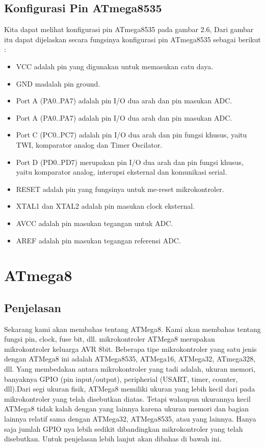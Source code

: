 		\subsection{Konfigurasi Pin ATmega8535}
		 Kita dapat melihat konfigurasi pin ATmega8535 pada gambar 2.6, Dari gambar itu dapat dijelaskan secara fungsinya konfigurasi pin ATmega8535 sebagai berikut :
		\begin{itemize}
			\item VCC adalah pin yang digunakan untuk memasukan catu daya.
			\item GND madalah pin ground.
			\item Port A (PA0..PA7) adalah pin I/O dua arah dan pin masukan ADC.
			\item Port A (PA0..PA7) adalah pin I/O dua arah dan pin masukan ADC.
			\item Port C (PC0..PC7) adalah pin I/O dua arah dan pin fungsi khusus, yaitu TWI, komparator analog dan Timer Oscilator.
			\item Port D (PD0..PD7) merupakan pin I/O dua arah dan pin fungsi khusus, yaitu komparator analog, interupsi eksternal dan komunikasi serial.
			\item RESET adalah pin yang fungsinya untuk me-reset mikrokontroler.
			\item XTAL1 dan XTAL2 adalah pin masukan clock eksternal.
			\item AVCC adalah pin masukan tegangan untuk ADC.
			\item AREF adalah pin masukan tegangan referensi ADC.
		\end{itemize}

\section{ATmega8}

	\subsection{Penjelasan}
		Sekarang kami akan membahas tentang ATMega8. Kami akan membahas tentang fungsi pin, clock, fuse bit, dll. mikrokontroler ATMega8 merupakan mikrokontroler keluarga AVR 8bit. Beberapa tipe mikrokontroler yang satu jenis dengan ATMega8 ini adalah ATMega8535, ATMega16, ATMega32, ATmega328, dll. Yang membedakan antara mikrokontroler yang tadi adalah, ukuran memori, banyaknya GPIO (pin input/output), peripherial (USART, timer, counter, dll).Dari segi ukuran fisik, ATMega8 memiliki ukuran yang lebih kecil dari pada mikrokontroler yang telah disebutkan diatas. Tetapi walaupun ukurannya kecil ATMega8 tidak kalah dengan yang lainnya karena ukuran memori dan bagian lainnya relatif sama dengan ATMega32, ATMega8535, atau yang lainnya. Hanya saja jumlah GPIO nya lebih sedikit dibandingkan mikrokontroler yang telah disebutkan. Untuk penjelasan lebih lanjut akan dibahas di bawah ini.
	
